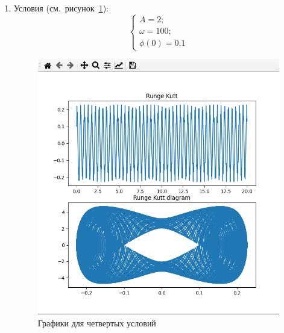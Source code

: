 \documentclass[a4paper,12pt]{article}
\begin{document}
\begin{enumerate}
		\item Условия (см.~рисунок~\ref{fig:4_praq}):
		\begin{equation}
			\begin{cases}
				A = 2; \\
				\omega = 100; \\
				\phi(0) = 0.1
			\end{cases}
		\end{equation}
		\begin{figure}[ht!]
			\begin{center}
			\includegraphics[scale=0.3]{sources/4_praq.png}
			\end{center}
			\vspace*{-8mm}
			\caption{Графики для четвертых условий}\label{fig:4_praq}
	  	\end{figure}

		\newpage


\end{enumerate}
\end{document}
